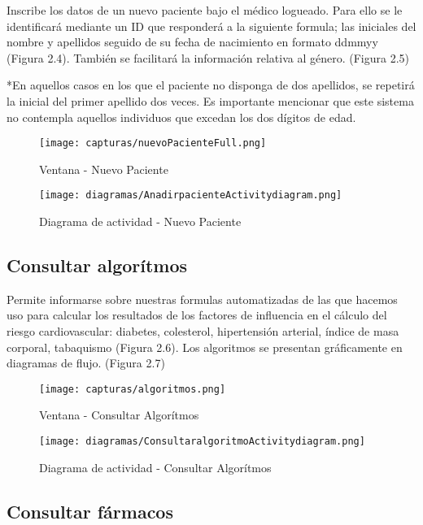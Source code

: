 \documentclass[11pt,spanish,
		listoftables,listoffigures]
		{tfgplantilla}
\begin{document}
Inscribe los datos de un nuevo paciente bajo el médico logueado. Para ello se le identificará mediante un ID que responderá a la siguiente formula; las iniciales del nombre y apellidos seguido de su fecha de nacimiento en formato ddmmyy (Figura 2.4). También se facilitará la información relativa al género. (Figura 2.5)

*En aquellos casos en los que el paciente no disponga de dos apellidos, se repetirá la inicial del primer apellido dos veces. Es importante mencionar que este sistema no contempla aquellos individuos que excedan los dos dígitos de edad.

\begin{figure}[H]
\centering
\texttt{[image: capturas/nuevoPacienteFull.png]}
\caption{Ventana - Nuevo Paciente}
\end{figure}

\begin{figure}[H]
\centering
\texttt{[image: diagramas/AnadirpacienteActivitydiagram.png]}
\caption{Diagrama de actividad - Nuevo Paciente}
\end{figure}

\subsection {Consultar algorítmos}

Permite informarse sobre nuestras formulas automatizadas de las que hacemos uso para calcular los resultados de los factores de influencia en el cálculo del riesgo cardiovascular: diabetes, colesterol, hipertensión arterial, índice de masa corporal, tabaquismo (Figura 2.6). Los algoritmos se presentan gráficamente en diagramas de flujo. (Figura 2.7)

\begin{figure}[H]
\centering
\texttt{[image: capturas/algoritmos.png]}
\caption{Ventana - Consultar Algorítmos}
\end{figure}

\begin{figure}[H]
\centering
\texttt{[image: diagramas/ConsultaralgoritmoActivitydiagram.png]}
\caption{Diagrama de actividad -  Consultar Algorítmos}
\end{figure}

\vfill
\subsection {Consultar fármacos}
\end{document}
